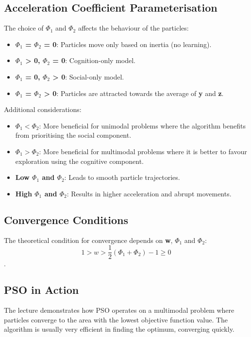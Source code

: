 \subsection*{Acceleration Coefficient Parameterisation}
The choice of $\Phi_1$ and $\Phi_2$ affects the behaviour of the particles:
\begin{itemize}
    \item \textbf{$\Phi_1$ = $\Phi_2$ = 0}: Particles move only based on inertia (no learning).
    \item \textbf{$\Phi_1$ > 0, $\Phi_2$ = 0}: Cognition-only model.
    \item \textbf{$\Phi_1$ = 0, $\Phi_2$ > 0}: Social-only model.
    \item \textbf{$\Phi_1$ = $\Phi_2$ > 0}: Particles are attracted towards the average of \textbf{y} and \textbf{z}.
\end{itemize}
Additional considerations:
\begin{itemize}
    \item \textbf{$\Phi_1 < \Phi_2$}: More beneficial for unimodal problems where the algorithm benefits from prioritising the social component.
    \item \textbf{$\Phi_1 > \Phi_2$}: More beneficial for multimodal problems where it is better to favour exploration using the cognitive component.
    \item \textbf{Low $\Phi_1$ and $\Phi_2$}: Leads to smooth particle trajectories.
    \item \textbf{High $\Phi_1$ and $\Phi_2$}: Results in higher acceleration and abrupt movements.
\end{itemize}

\subsection*{Convergence Conditions}
The theoretical condition for convergence depends on \textbf{w}, $\Phi_1$ and $\Phi_2$: $$1 > w > \frac{1}{2}(\Phi_1 + \Phi_2) - 1 \ge 0$$.

\subsection*{PSO in Action}
The lecture demonstrates how PSO operates on a multimodal problem where particles converge to the area with the lowest objective function value. The algorithm is usually very efficient in finding the optimum, converging quickly.

